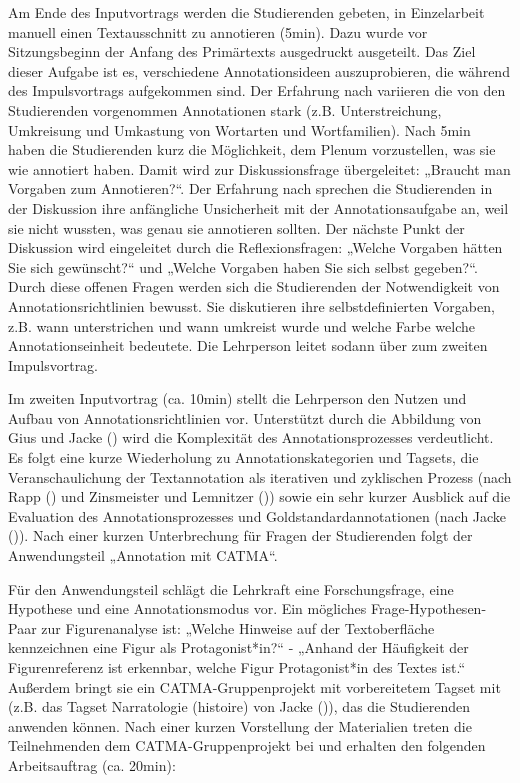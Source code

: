 \documentclass[
          a4paper,
        ]{article}
\begin{document}
Am Ende des Inputvortrags werden die Studierenden gebeten, in
Einzelarbeit manuell einen Textausschnitt zu annotieren (5min). Dazu
wurde vor Sitzungsbeginn der Anfang des Primärtexts ausgedruckt
ausgeteilt. Das Ziel dieser Aufgabe ist es, verschiedene
Annotationsideen auszuprobieren, die während des Impulsvortrags
aufgekommen sind. Der Erfahrung nach variieren die von den Studierenden
vorgenommen Annotationen stark (z.B. Unterstreichung, Umkreisung und
Umkastung von Wortarten und Wortfamilien). Nach 5min haben die
Studierenden kurz die Möglichkeit, dem Plenum vorzustellen, was sie wie
annotiert haben. Damit wird zur Diskussionsfrage übergeleitet: „Braucht
man Vorgaben zum Annotieren?``. Der Erfahrung nach sprechen die
Studierenden in der Diskussion ihre anfängliche Unsicherheit mit der
Annotationsaufgabe an, weil sie nicht wussten, was genau sie annotieren
sollten. Der nächste Punkt der Diskussion wird eingeleitet durch die
Reflexionsfragen: „Welche Vorgaben hätten Sie sich gewünscht?`` und
„Welche Vorgaben haben Sie sich selbst gegeben?``. Durch diese offenen
Fragen werden sich die Studierenden der Notwendigkeit von
Annotationsrichtlinien bewusst. Sie diskutieren ihre selbstdefinierten
Vorgaben, z.B. wann unterstrichen und wann umkreist wurde und welche
Farbe welche Annotationseinheit bedeutete. Die Lehrperson leitet sodann
über zum zweiten Impulsvortrag.

Im zweiten Inputvortrag (ca. 10min) stellt die Lehrperson den Nutzen und
Aufbau von Annotationsrichtlinien vor. Unterstützt durch die Abbildung
von Gius und Jacke () wird die
Komplexität des Annotationsprozesses verdeutlicht. Es folgt eine kurze
Wiederholung zu Annotationskategorien und Tagsets, die Veranschaulichung
der Textannotation als iterativen und zyklischen Prozess (nach Rapp
() und Zinsmeister und Lemnitzer
()) sowie ein sehr
kurzer Ausblick auf die Evaluation des Annotationsprozesses und
Goldstandardannotationen (nach Jacke
()).
Nach einer kurzen Unterbrechung für Fragen der Studierenden folgt der
Anwendungsteil „Annotation mit CATMA``.

Für den Anwendungsteil schlägt die Lehrkraft eine Forschungsfrage, eine
Hypothese und eine Annotationsmodus vor. Ein mögliches
Frage-Hypothesen-Paar zur Figurenanalyse ist: „Welche Hinweise auf der
Textoberfläche kennzeichnen eine Figur als Protagonist*in?`` - „Anhand
der Häufigkeit der Figurenreferenz ist erkennbar, welche Figur
Protagonist*in des Textes ist.`` Außerdem bringt sie ein
CATMA-Gruppenprojekt mit vorbereitetem Tagset mit (z.B. das Tagset
Narratologie (histoire) von Jacke
()), das die
Studierenden anwenden können. Nach einer kurzen Vorstellung der
Materialien treten die Teilnehmenden dem CATMA-Gruppenprojekt bei und
erhalten den folgenden Arbeitsauftrag (ca. 20min):
\end{document}
